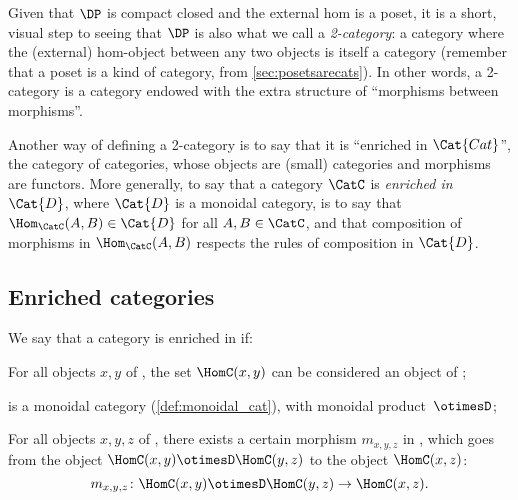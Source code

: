 Given that $\DP$ is compact closed and the external hom is a poset, it is a short, visual step to seeing that $\DP$ is also what we call a \emph{2-category}: a category where the (external) hom-object between any two objects is itself a category (remember that a poset is a kind of category, from \cref{sec:posetsarecats}). In other words, a 2-category is a category endowed with the extra structure of ``morphisms between morphisms''.

Another way of defining a 2-category is to say that it is ``enriched in $\Cat{Cat}$'', the category of categories, whose objects are (small) categories and morphisms are functors. More generally, to say that a category $\CatC$ is \emph{enriched in $\Cat{D}$}, where $\Cat{D}$ is a monoidal category, is to say that $\Hom_\CatC(A,B) \in \Cat{D}$ for all $A,B \in \CatC$, and that composition of morphisms in $\Hom_\CatC(A,B)$ respects the rules of composition in $\Cat{D}$.

\subsection{Enriched categories}

\begin{ctdefinition}
We say that a category \CatC is enriched in \CatD if:
\begin{compactenum}
    \item For all objects $x, y$ of \CatC, the set $\HomC(x,y)$ can be considered an object of \CatD;
    \item \CatD is a monoidal category (\cref{def:monoidal_cat}),
    with monoidal product~$\otimesD$;
    \item For all objects $x, y, z$ of \CatC, there exists
    a certain morphism $m_{x,y,z}$ in \CatD,
    which goes from the object $\HomC(x, y) \otimesD \HomC(y, z)$ to the object $\HomC(x, z)$:
    \begin{equation} \label{eq:enriched-condition}
        m_{x,y,z} \colon \HomC(x, y) \otimesD \HomC(y, z) \to \HomC(x, z) .
    \end{equation}
\end{compactenum}
\end{ctdefinition}

%

